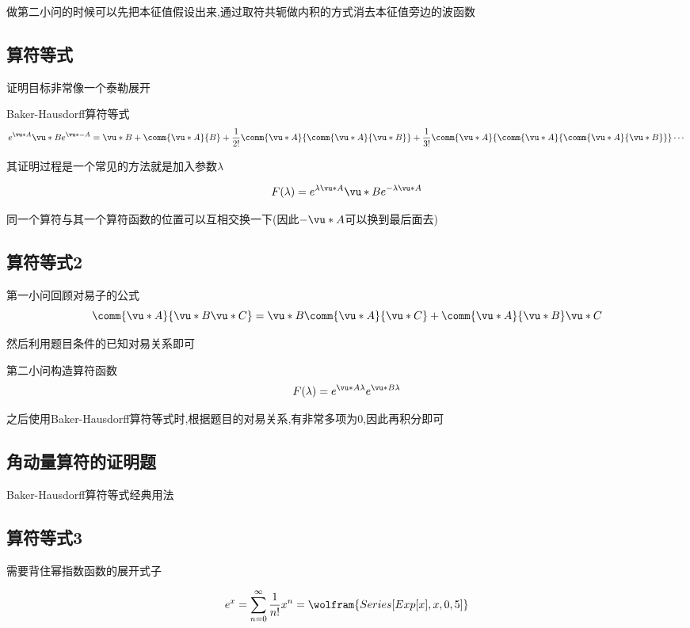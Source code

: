             做第二小问的时候可以先把本征值假设出来,通过取符共轭做内积的方式消去本征值旁边的波函数

        \subsection{算符等式}
            \begin{formal}
                证明目标非常像一个泰勒展开

                Baker-Hausdorff算符等式
                $$ e^{\vu*{A}} \vu*{B} e^{\vu*{-A}} = \vu*{B} + \comm{\vu*{A}}{B} + \frac{1}{2!} \comm{\vu*{A}}{\comm{\vu*{A}}{\vu*{B}}} + \frac{1}{3!} \comm{\vu*{A}}{\comm{\vu*{A}}{\comm{\vu*{A}}{\vu*{B}}}} \cdots $$

                其证明过程是一个常见的方法就是加入参数$\lambda$ 

                $$ F(\lambda) = e^{\lambda \vu*{A}} \vu*{B} e^{-\lambda \vu*{A}} $$

                同一个算符与其一个算符函数的位置可以互相交换一下(因此$-\vu*{A}$可以换到最后面去)
            \end{formal}

        \subsection{算符等式2}
            第一小问回顾对易子的公式
            $$ \comm{\vu*{A}}{\vu*{B}\vu*{C}} = \vu*{B} \comm{\vu*{A}}{\vu*{C}} + \comm{\vu*{A}}{\vu*{B}}\vu*{C} $$
        
            然后利用题目条件的已知对易关系即可

            第二小问构造算符函数
            $$ F(\lambda) = e^{\vu*{A} \lambda} e^{\vu*{B} \lambda} $$

            之后使用Baker-Hausdorff算符等式时,根据题目的对易关系,有非常多项为0,因此再积分即可
        
        \subsection{角动量算符的证明题}
            Baker-Hausdorff算符等式经典用法

        \subsection{算符等式3}
            需要背住幂指数函数的展开式子
            \begin{formal}
                $$ e^{x} = \sum_{n=0}^{\infty} \frac{1}{n!} x^{n} = \wolfram{Series[Exp[x],{x,0,5}]} $$
            \end{formal}
        
